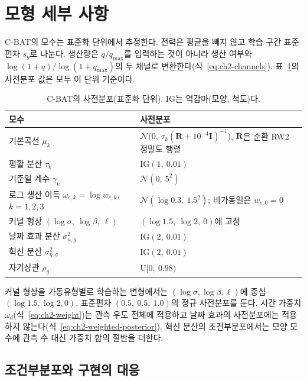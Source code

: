 \section{모형 세부 사항}
\label{app:model}

C-BAT의 모수는 표준화 단위에서 추정한다. 전력은 평균을 빼지 않고 학습 구간 표준편차 $s_y$로 나눈다. 생산량은 $q/q_{\max}$를 입력하는 것이 아니라 생산 여부와 $\log(1+q)/\log(1+q_{\max})$의 두 채널로 변환한다(식~\ref{eq:ch2-channels}). 표~\ref{tab:chB-prior}의 사전분포 값은 모두 이 단위 기준이다.

\begin{table}[htbp]
\centering
\caption{C-BAT의 사전분포(표준화 단위). IG는 역감마(모양, 척도)다.}
\label{tab:chB-prior}
\small
\begin{tabular}{ll}
\toprule
모수 & 사전분포 \\
\midrule
기본곡선 $\mu_{k,\cdot}$ & $\mathcal N\big(0,\ \tau_k(\mathbf R+10^{-4}\mathbf I)^{-1}\big)$, $\mathbf R$은 순환 RW2 정밀도 행렬 \\
평활 분산 $\tau_k$ & $\mathrm{IG}(1,\ 0.01)$ \\
기준일 계수 $\gamma_k$ & $\mathcal N(0,\ 5^2)$ \\
로그 생산 이득 $\omega_{c,k}=\log w_{c,k}$, $k=1,2,3$ & $\mathcal N(\log 0.3,\ 1.5^2)$; 비가동일은 $w_{c,0}=0$ \\
커널 형상 $(\log\sigma,\ \log\beta,\ \ell)$ & $(\log 1.5,\ \log 2,\ 0)$에 고정 \\
날짜 효과 분산 $\sigma^2_{u,g}$ & $\mathrm{IG}(2,\ 0.01)$ \\
혁신 분산 $\sigma^2_{\eta,g}$ & $\mathrm{IG}(2,\ 0.01)$ \\
자기상관 $\rho_g$ & $\mathrm U[0,\ 0.98)$ \\
\bottomrule
\end{tabular}
\end{table}

커널 형상을 가동유형별로 학습하는 변형에서는 $(\log\sigma,\log\beta,\ell)$에 중심 $(\log1.5,\log2,0)$, 표준편차 $(0.5,\ 0.5,\ 1.0)$의 정규 사전분포를 둔다. 시간 가중치 $\omega_d$(식~\ref{eq:ch2-weight})는 관측 우도 전체에 적용하고 날짜 효과의 사전분포에는 적용하지 않는다(식~\ref{eq:ch2-weighted-posterior}). 혁신 분산의 조건부분포에서는 모양 모수에 관측 수 대신 가중치 합의 절반을 더한다.

\subsection{조건부분포와 구현의 대응}

